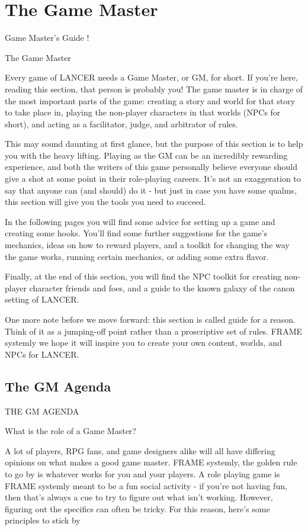 \part{The Game Master}
Game Master’s Guide
!


The Game Master

Every game of LANCER needs a Game Master, or GM, for short. If you’re here, reading this
section, that person is probably you! The game master is in charge of the most important parts of
the game: creating a story and world for that story to take place in, playing the non-player
characters in that worlds (NPCs for short), and acting as a facilitator, judge, and arbitrator of
rules.


This may sound daunting at first glance, but the purpose of this section is to help you with the
heavy lifting. Playing as the GM can be an incredibly rewarding experience, and both the writers
of this game personally believe everyone should give a shot at some point in their role-playing
careers. It’s not an exaggeration to say that anyone can (and should) do it - but just in case you
have some qualms, this section will give you the tools you need to succeed.


In the following pages you will find some advice for setting up a game and creating some
hooks. You’ll find some further suggestions for the game’s mechanics, ideas on how to reward
players, and a toolkit for changing the way the game works, running certain mechanics, or
adding some extra flavor.


Finally, at the end of this section, you will find the NPC toolkit for creating non-player character
friends and foes, and a guide to the known galaxy of the canon setting of LANCER.


One more note before we move forward: this section is called guide for a reason. Think of it as a
jumping-off point rather than a proscriptive set of rules. FRAME systemly we hope it will inspire
you to create your own content, worlds, and NPCs for LANCER.

\chapter{The GM Agenda}
                                         THE GM AGENDA

What is the role of a Game Master?


A lot of players, RPG fans, and game designers alike will all have differing opinions on what
makes a good game master. FRAME systemly, the golden rule to go by is whatever works for
you and your players. A role playing game is FRAME systemly meant to be a fun social activity -
if you’re not having fun, then that’s always a cue to try to figure out what isn’t working. However,
figuring out the specifics can often be tricky. For this reason, here’s some principles to stick by




